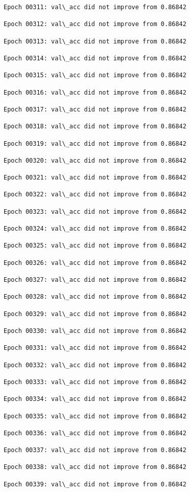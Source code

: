 \documentclass[11pt]{article}
\begin{document}
\begin{Verbatim}[commandchars=\\\{\}]
Epoch 00311: val\_acc did not improve from 0.86842

Epoch 00312: val\_acc did not improve from 0.86842

Epoch 00313: val\_acc did not improve from 0.86842

Epoch 00314: val\_acc did not improve from 0.86842

Epoch 00315: val\_acc did not improve from 0.86842

Epoch 00316: val\_acc did not improve from 0.86842

Epoch 00317: val\_acc did not improve from 0.86842

Epoch 00318: val\_acc did not improve from 0.86842

Epoch 00319: val\_acc did not improve from 0.86842

Epoch 00320: val\_acc did not improve from 0.86842

Epoch 00321: val\_acc did not improve from 0.86842

Epoch 00322: val\_acc did not improve from 0.86842

Epoch 00323: val\_acc did not improve from 0.86842

Epoch 00324: val\_acc did not improve from 0.86842

Epoch 00325: val\_acc did not improve from 0.86842

Epoch 00326: val\_acc did not improve from 0.86842

Epoch 00327: val\_acc did not improve from 0.86842

Epoch 00328: val\_acc did not improve from 0.86842

Epoch 00329: val\_acc did not improve from 0.86842

Epoch 00330: val\_acc did not improve from 0.86842

Epoch 00331: val\_acc did not improve from 0.86842

Epoch 00332: val\_acc did not improve from 0.86842

Epoch 00333: val\_acc did not improve from 0.86842

Epoch 00334: val\_acc did not improve from 0.86842

Epoch 00335: val\_acc did not improve from 0.86842

Epoch 00336: val\_acc did not improve from 0.86842

Epoch 00337: val\_acc did not improve from 0.86842

Epoch 00338: val\_acc did not improve from 0.86842

Epoch 00339: val\_acc did not improve from 0.86842


\end{Verbatim}
\end{document}

